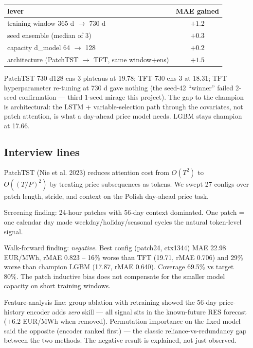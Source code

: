 \begin{center}
\begin{tabular}{lc}
\toprule
lever & MAE gained \\
\midrule
training window 365 d $\to$ 730 d & $+1.2$ \\
seed ensemble (median of 3) & $+0.3$ \\
capacity d\_model 64 $\to$ 128 & $+0.2$ \\
architecture (PatchTST $\to$ TFT, same window+ens) & $+1.5$ \\
\bottomrule
\end{tabular}
\end{center}

PatchTST-730 d128 ens-3 plateaus at 19.78; TFT-730 ens-3 at 18.31; TFT
hyperparameter re-tuning at 730 d gave nothing (the seed-42 ``winner''
failed 2-seed confirmation --- third 1-seed mirage this project). The
gap to the champion is architectural: the LSTM + variable-selection
path through the covariates, not patch attention, is what a day-ahead
price model needs. LGBM stays champion at 17.66.

\subsection{Interview lines}

PatchTST (Nie et al. 2023) reduces attention cost from $O(T^2)$ to
$O((T/P)^2)$ by treating price subsequences as tokens. We swept 27
configs over patch length, stride, and context on the Polish day-ahead
price task.

Screening finding: 24-hour patches with 56-day context dominated.
One patch = one calendar day made weekday/holiday/seasonal cycles the
natural token-level signal.

Walk-forward finding: \textit{negative}. Best config (patch24, ctx1344)
MAE 22.98 EUR/MWh, rMAE 0.823 -- 16\% worse than TFT (19.71, rMAE 0.706)
and 29\% worse than champion LGBM (17.87, rMAE 0.640). Coverage 69.5\%
vs target 80\%. The patch inductive bias does not compensate for the
smaller model capacity on short training windows.

Feature-analysis line: group ablation with retraining showed the
56-day price-history encoder adds \emph{zero} skill --- all signal
sits in the known-future RES forecast ($+6.2$ EUR/MWh when removed).
Permutation importance on the fixed model said the opposite (encoder
ranked first) --- the classic reliance-vs-redundancy gap between the
two methods. The negative result is explained, not just observed.


